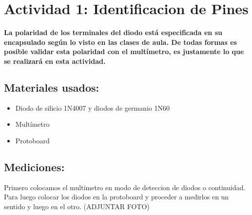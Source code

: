 \section{Actividad 1: Identificacion de Pines}

\paragraph{La polaridad de los terminales del diodo está especificada en su encapsulado según lo visto en las clases de aula. De todas formas es posible validar esta polaridad con el multímetro, es justamente lo que se realizará en esta actividad.}

\subsection{Materiales usados:}
\begin{itemize}
    \item Diodo de silicio 1N4007 y diodos de germanio 1N60
    \item Multímetro
    \item Protoboard
\end{itemize}


\subsection{Mediciones:}
Primero colocamos el multimetro en modo de deteccion de diodos o continuidad. Para luego colocar los diodos en la protoboard y proceder a medirlos en un sentido y luego en el otro.  (ADJUNTAR FOTO)

